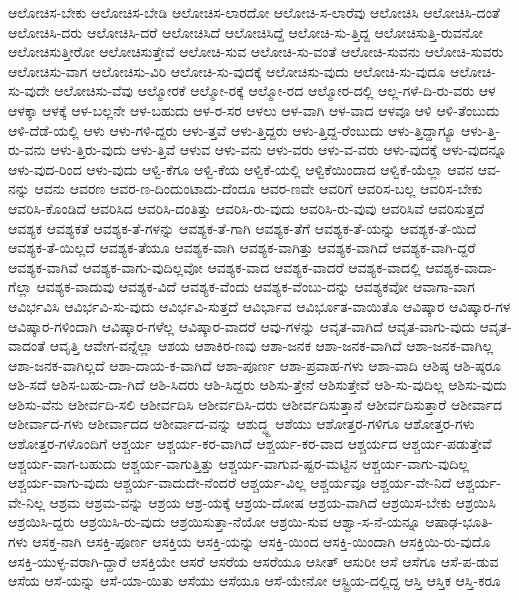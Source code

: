 {ಆಲೋಚಿಸ-ಬೇಕು
ಆಲೋಚಿಸ-ಬೇಡಿ
ಆಲೋಚಿಸ-ಲಾರದೋ
ಆಲೋಚಿ-ಸ-ಲಾರೆವು
ಆಲೋಚಿಸಿ
ಆಲೋಚಿಸಿ-ದಂತೆ
ಆಲೋಚಿಸಿ-ದರು
ಆಲೋಚಿಸಿ-ದರೆ
ಆಲೋಚಿಸಿದೆ
ಆಲೋಚಿಸಿದ್ದೆ
ಆಲೋಚಿ-ಸು-ತ್ತಿದ್ದ
ಆಲೋಚಿಸುತ್ತಿ-ರುವನೋ
ಆಲೋಚಿಸುತ್ತೀರೋ
ಆಲೋಚಿಸುತ್ತೇವೆ
ಆಲೋಚಿ-ಸುವ
ಆಲೋಚಿ-ಸು-ವಂತೆ
ಆಲೋಚಿ-ಸುವನು
ಆಲೋಚಿ-ಸುವರು
ಆಲೋಚಿಸು-ವಾಗ
ಆಲೋಚಿಸು-ವಿರಿ
ಆಲೋಚಿ-ಸು-ವುದಕ್ಕೆ
ಆಲೋಚಿಸು-ವುದು
ಆಲೋಚಿ-ಸು-ವುದೂ
ಆಲೋಚಿ-ಸು-ವುದೇ
ಆಲೋಚಿಸು-ವೆವು
ಆಲ್ಮೋರಕೆ
ಆಲ್ಮೋ-ರಕ್ಕೆ
ಆಲ್ಮೋ-ರದ
ಆಲ್ಮೋರ-ದಲ್ಲಿ
ಆಲ್ಲ-ಗಳೆ-ದಿ-ರು-ವರು
ಆಳ
ಆಳಕ್ಕಾ
ಆಳಕ್ಕೆ
ಆಳ-ಬಲ್ಲನೇ
ಆಳ-ಬಹುದು
ಆಳ-ರ-ಸರ
ಆಳಲು
ಆಳ-ವಾಗಿ
ಆಳ-ವಾದ
ಆಳವೂ
ಆಳಿ
ಆಳಿ-ತೆಂಬುದು
ಆಳಿ-ದೆಡೆ-ಯಲ್ಲಿ
ಆಳು
ಆಳು-ಗಳಿ-ದ್ದರು
ಆಳು-ತ್ತವೆ
ಆಳು-ತ್ತಿದ್ದರು
ಆಳು-ತ್ತಿದ್ದ-ರೆಂಬುದು
ಆಳು-ತ್ತಿದ್ದಾಗ್ಯೂ
ಆಳು-ತ್ತಿ-ರು-ವನು
ಆಳು-ತ್ತಿರು-ವುದು
ಆಳು-ತ್ತಿವೆ
ಆಳುವ
ಆಳು-ವನು
ಆಳು-ವರು
ಆಳು-ವ-ವರು
ಆಳು-ವುದಕ್ಕೆ
ಆಳು-ವುದನ್ನೂ
ಆಳು-ವುದ-ರಿಂದ
ಆಳು-ವುದು
ಆಳ್ವಿ-ಕೆಗೂ
ಆಳ್ವಿ-ಕೆಯ
ಆಳ್ವಿಕೆ-ಯಲ್ಲಿ
ಆಳ್ವಿಕೆಯಿಂದಾದ
ಆಳ್ವಿಕೆ-ಯೆಲ್ಲಾ
ಆವನ
ಆವ-ನನ್ನು
ಆವನು
ಆವರಣ
ಆವರ-ಣ-ದಿಂದುಂಟಾದು-ದೆಂದೂ
ಆವರ-ಣವೇ
ಆವರಿಗೆ
ಆವರಿಸ-ಬಲ್ಲ
ಆವರಿಸ-ಬೇಕು
ಆವರಿಸಿ-ಕೊಂಡಿದೆ
ಆವರಿಸಿದ
ಆವರಿಸಿ-ದಂತಿತ್ತು
ಆವರಿಸಿ-ರು-ವುದು
ಆವರಿಸಿ-ರು-ವುವು
ಆವರಿಸಿವೆ
ಆವರಿಸುತ್ತದೆ
ಆವಶ್ಯಕ
ಆವಶ್ಯಕತೆ
ಆವಶ್ಯಕ-ತೆ-ಗಳನ್ನು
ಆವಶ್ಯಕ-ತೆ-ಗಾಗಿ
ಆವಶ್ಯಕ-ತೆಗೆ
ಆವಶ್ಯಕ-ತೆ-ಯನ್ನು
ಆವಶ್ಯಕ-ತೆ-ಯಿದೆ
ಆವಶ್ಯಕ-ತೆ-ಯಿಲ್ಲದೆ
ಆವಶ್ಯಕ-ತೆಯೂ
ಆವಶ್ಯಕ-ವಾಗಿ
ಆವಶ್ಯಕ-ವಾಗಿತ್ತು
ಆವಶ್ಯಕ-ವಾಗಿದೆ
ಆವಶ್ಯಕ-ವಾಗಿ-ದ್ದರೆ
ಆವಶ್ಯಕ-ವಾಗಿವೆ
ಆವಶ್ಯಕ-ವಾಗು-ವುದಿಲ್ಲವೋ
ಆವಶ್ಯಕ-ವಾದ
ಆವಶ್ಯಕ-ವಾದರೆ
ಆವಶ್ಯಕ-ವಾದಲ್ಲಿ
ಆವಶ್ಯಕ-ವಾದಾ-ಗೆಲ್ಲಾ
ಆವಶ್ಯಕ-ವಾದುವು
ಆವಶ್ಯಕ-ವಿದೆ
ಆವಶ್ಯಕ-ವೆಂದು
ಆವಶ್ಯಕ-ವೆಂಬು-ದನ್ನು
ಆವಶ್ಯಕವೋ
ಆವಾಗಾ-ವಾಗ
ಆವಿರ್ಭವಿಸಿ
ಆವಿರ್ಭವಿ-ಸು-ವುದು
ಆವಿರ್ಭವಿ-ಸುತ್ತದೆ
ಆವಿರ್ಭಾವ
ಆವಿರ್ಭೂತ-ವಾಯಿತೊ
ಆವಿಷ್ಕಾರ
ಆವಿಷ್ಕಾರ-ಗಳ
ಆವಿಷ್ಕಾರ-ಗಳಿಂದಾಗಿ
ಆವಿಷ್ಕಾರ-ಗಳೆಲ್ಲ
ಆವಿಷ್ಕಾರ-ವಾದರೆ
ಆವು-ಗಳನ್ನು
ಆವೃತ-ವಾಗಿದೆ
ಆವೃತ-ವಾಗು-ವುದು
ಆವೃತ-ವಾದಂತೆ
ಆವೃತ್ತಿ
ಆವೇಗ-ವನ್ನೆಲ್ಲಾ
ಆಶಯ
ಆಶಾಕಿರ-ಣವು
ಆಶಾ-ಜನಕ
ಆಶಾ-ಜನಕ-ವಾಗಿದೆ
ಆಶಾ-ಜನಕ-ವಾಗಿಲ್ಲ
ಆಶಾ-ಜನಕ-ವಾಗಿಲ್ಲದೆ
ಆಶಾ-ದಾಯ-ಕ-ವಾಗಿದೆ
ಆಶಾ-ಪೂರ್ಣ
ಆಶಾ-ಪ್ರವಾಹ-ಗಳು
ಆಶಾ-ವಾದಿ
ಆಶಿಷ್ಠ
ಆಶಿ-ಷ್ಠರೂ
ಆಶಿ-ಸದೆ
ಆಶಿಸ-ಬಹು-ದಾ-ಗಿದೆ
ಆಶಿ-ಸಿದರು
ಆಶಿ-ಸಿದ್ದರು
ಆಶಿಸು-ತ್ತೇನೆ
ಆಶಿಸುತ್ತೇವೆ
ಆಶಿ-ಸು-ವುದಿಲ್ಲ
ಆಶಿಸು-ವುದು
ಆಶಿಸು-ವೆನು
ಆಶೀರ್ವದಿ-ಸಲಿ
ಆಶೀರ್ವದಿಸಿ
ಆಶೀರ್ವದಿಸಿ-ದರು
ಆಶೀರ್ವದಿಸುತ್ತಾನೆ
ಆಶೀರ್ವದಿಸುತ್ತಾರೆ
ಆಶೀರ್ವಾದ
ಆಶೀರ್ವಾದ-ಗಳು
ಆಶೀರ್ವಾದದ
ಆಶೀರ್ವಾದ-ವನ್ನು
ಆಶುದ್ಧ್ದ
ಆಶೆಯು
ಆಶೋತ್ತರ-ಗಳಿಗೂ
ಆಶೋತ್ತರ-ಗಳು
ಆಶೋತ್ತರ-ಗಳೊಂದಿಗೆ
ಆಶ್ಚರ್ಯ
ಆಶ್ಚರ್ಯ-ಕರ-ವಾಗಿದೆ
ಆಶ್ಚರ್ಯ-ಕರ-ವಾದ
ಆಶ್ಚರ್ಯದ
ಆಶ್ಚರ್ಯ-ಪಡುತ್ತೇವೆ
ಆಶ್ಚರ್ಯ-ವಾಗ-ಬಹುದು
ಆಶ್ಚರ್ಯ-ವಾಗುತ್ತಿತ್ತು
ಆಶ್ಚರ್ಯ-ವಾಗುವ-ಷ್ಟರ-ಮಟ್ಟಿನ
ಆಶ್ಚರ್ಯ-ವಾಗು-ವುದಿಲ್ಲ
ಆಶ್ಚರ್ಯ-ವಾಗು-ವುದು
ಆಶ್ಚರ್ಯ-ವಾದುದೇ-ನೆಂದರೆ
ಆಶ್ಚರ್ಯ-ವಿಲ್ಲ
ಆಶ್ಚರ್ಯವೂ
ಆಶ್ಚರ್ಯ-ವೇ-ನಿದೆ
ಆಶ್ಚರ್ಯ-ವೇ-ನಿಲ್ಲ
ಆಶ್ರಮ
ಆಶ್ರಮ-ವನ್ನು
ಆಶ್ರಯ
ಆಶ್ರ-ಯಕ್ಕೆ
ಆಶ್ರಯ-ದೋಷ
ಆಶ್ರಯ-ವಾಗಿದೆ
ಆಶ್ರಯಿಸ-ಬೇಕು
ಆಶ್ರಯಿಸಿ
ಆಶ್ರಯಿಸಿ-ದ್ದರು
ಆಶ್ರಯಿಸಿ-ರು-ವುದು
ಆಶ್ರಯಿಸುತ್ತಾ-ನೆಯೋ
ಆಶ್ರಯಿ-ಸುವ
ಆಶ್ವಾ-ಸ-ನೆ-ಯನ್ನೂ
ಆಷಾಢ-ಭೂತಿ-ಗಳು
ಆಸಕ್ತ-ನಾಗಿ
ಆಸಕ್ತಿ-ಪೂರ್ಣ
ಆಸಕ್ತಿಯ
ಆಸಕ್ತಿ-ಯನ್ನು
ಆಸಕ್ತಿ-ಯಿಂದ
ಆಸಕ್ತಿ-ಯಿಂದಾಗಿ
ಆಸಕ್ತಿಯಿ-ರು-ವುದೊ
ಆಸಕ್ತಿ-ಯುಳ್ಳ-ವರಾಗಿ-ದ್ದಾರೆ
ಆಸಕ್ತಿಯೇ
ಆಸರೆ
ಆಸರೆಯ
ಆಸರೆಯೂ
ಆಸೀತ್
ಆಸುರೀ
ಆಸೆ
ಆಸೆಗೂ
ಆಸೆ-ಪ-ಡುವ
ಆಸೆಯ
ಆಸೆ-ಯನ್ನು
ಆಸೆ-ಯಾ-ಯಿತು
ಆಸೆಯು
ಆಸೆಯೂ
ಆಸೆ-ಯೇನೋ
ಆಸ್ಟ್ರಿಯ-ದಲ್ಲಿದ್ದ
ಆಸ್ತಿ
ಆಸ್ತಿಕ
ಆಸ್ತಿ-ಕರೂ
}
